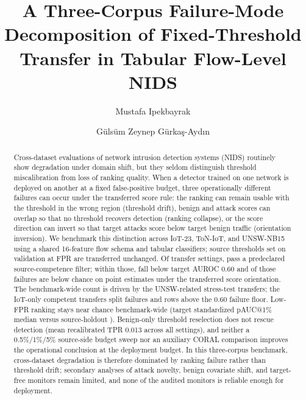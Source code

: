 \documentclass[preprint,12pt]{elsarticle}
\begin{document}
\begin{frontmatter}

\title{A Three-Corpus Failure-Mode Decomposition of Fixed-Threshold Transfer in Tabular Flow-Level NIDS}

\author[aff1]{Mustafa Ipekbayrak}
\author[aff1]{G{\"u}ls{\"u}m Zeynep G{\"u}rka\c{s}-Ayd{\i}n}

\begin{abstract}
Cross-dataset evaluations of network intrusion detection systems (NIDS) routinely show degradation under domain shift, but they seldom distinguish threshold miscalibration from loss of ranking quality. When a detector trained on one network is deployed on another at a fixed false-positive budget, three operationally different failures can occur under the transferred score rule: the ranking can remain usable with the threshold in the wrong region (threshold drift), benign and attack scores can overlap so that no threshold recovers detection (ranking collapse), or the score direction can invert so that target attacks score below target benign traffic (orientation inversion). We benchmark this distinction across IoT-23, ToN-IoT, and UNSW-NB15 using a shared 16-feature flow schema and \ModelCount{} tabular classifiers; source thresholds set on validation at \FrozenFprTarget{} FPR are transferred unchanged. Of \NaturalSettingCount{} transfer settings, \CompetentSettingCount{} pass a predeclared source-competence filter; within those, \CompetentRankingFailureCount{} fall below target AUROC 0.60 and \CompetentInversionCount{} of those failures are below chance on point estimates under the transferred score orientation. The benchmark-wide count is driven by the \CompetentUnswStressTestSettingCount{} UNSW-related stress-test transfers; the \CompetentIotOnlySettingCount{} IoT-only competent transfers split \CompetentIotOnlyRankingFailureCount{} failures and \CompetentIotOnlyNonCollapsedCount{} rows above the 0.60 failure floor. Low-FPR ranking stays near chance benchmark-wide (target standardized pAUC@1\% median \CompetentTargetPaucMedian{} versus source-holdout \CompetentSourcePaucMedian{}). Benign-only threshold reselection does not rescue detection (mean recalibrated TPR 0.013 across all \NaturalSettingCount{} settings), and neither a 0.5\%/1\%/5\% source-side budget sweep nor an auxiliary CORAL comparison improves the operational conclusion at the deployment budget. In this three-corpus benchmark, cross-dataset degradation is therefore dominated by ranking failure rather than threshold drift; secondary analyses of attack novelty, benign covariate shift, and target-free monitors remain limited, and none of the audited monitors is reliable enough for deployment.
\end{abstract}


\end{frontmatter}
\end{document}
